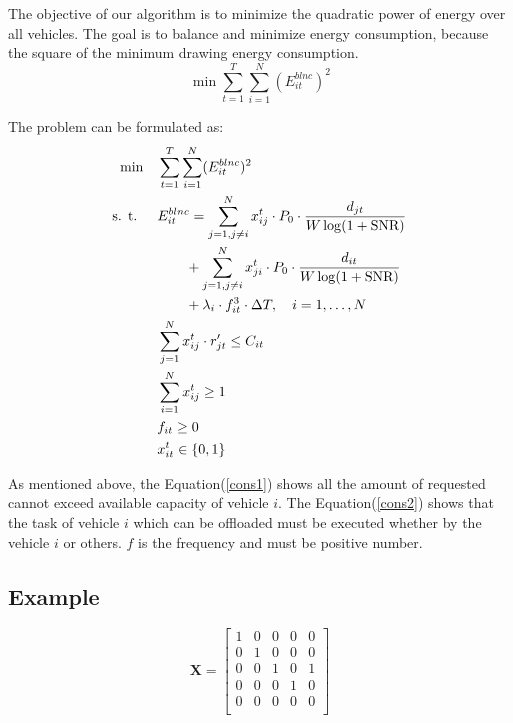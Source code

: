 \documentclass[conference]{IEEEtran}
\begin{document}
The objective of our algorithm is to minimize the quadratic power of energy over all vehicles. The goal is to balance and minimize energy consumption, because the square of the minimum drawing energy consumption. 
\begin{equation}
	\min\sum \limits _{t=1} ^{T} \sum \limits _{i=1}^{N} (E^{blnc}_{it} )^ 2
\end{equation}

The problem can be formulated as:  
\begin{align}  		
	\min  \quad  &\sum \limits _{t=1} ^{T} \sum \limits _{i=1}^{N} (E^{blnc}_{it} )^ 2  \\
	\text{s. t. }   \quad   & 	    	E^{blnc} _{it}=
	\sum \limits_{j=1,  j \ne i}^{N} x _{ij}^{t} \cdot P_0 \cdot \frac{d_{jt}}{W\log (1 + \text{SNR})}  \notag \\
	&\quad \quad +\sum_{j=1 ,j \ne i }^{N} x _{ji}^{t} \cdot P_0 \cdot \frac{d_{it}}{W\log (1 + \text{SNR})}  \notag \\
	&\quad  \quad + \lambda_{i} \cdot f_{it}^{3} \cdot \Delta T
	,\quad i = 1, \dots ,N      \\
	& \sum    _{ j= 1} ^{N}
	{ x_{ij}^{t} \cdot  r'_{jt}} \le C_{it}       \label{cons1}   \\
	& \sum  _{ i= 1} ^N x_{ij}^{t} 	\ge 1  \label{cons2} \\
	&     	f_{it} \ge 0         \label{cons3}\\
	&      x_{it}^{t} \in \{0,1\}	  \label{cons4}
\end{align} 

As mentioned above, the Equation(\ref{cons1}) shows all the amount of requested cannot exceed available capacity of vehicle $i$. 
The Equation(\ref{cons2}) shows that the task of vehicle $i$ which can be offloaded must be executed whether by the vehicle $i$ or others. $f$ is the frequency and must be positive number. 

\subsection{Example}
\begin{equation*}
	\mathbf{X} = 
	\begin{bmatrix}		
		1  &  0  &  0   &0  &  0 \\
		0  &  1  &  0  &  0 &   0\\
		0  &  0  &  1 &   0  &  1\\
		0  &  0 &  0   & 1   & 0 \\
		0  &  0 &   0   & 0 &   0\\
	\end{bmatrix}
\end{equation*}
\end{document}
